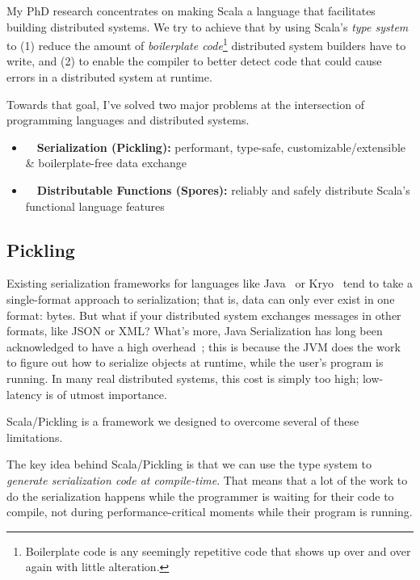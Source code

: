 \documentclass[acmtocl]{acmtrans2m}
\begin{document}
My PhD research concentrates on making Scala a language that facilitates
building distributed systems. We try to achieve that by using Scala's
\textit{type system} to (1) reduce the amount of \textit{boilerplate code}\footnote{Boilerplate code is any seemingly repetitive code that shows up over and over again with little alteration.} distributed system builders have to write, and
(2) to enable the compiler to better detect code that could cause errors
in a distributed system at runtime.

Towards that goal, I've solved two major problems at the intersection of
programming languages and distributed systems.

\vspace{-0.15in}
\begin{itemize}
\item ~~\textbf{\textsf{Serialization (Pickling):}} performant, type-safe, customizable/extensible \& boilerplate-free data exchange
\item ~~\textbf{\textsf{Distributable Functions (Spores):}} reliably and safely distribute Scala's functional language features
\end{itemize}

\vspace{-0.2in}
\subsection*{\textbf{Pickling}}
\vspace{-0.1in}

Existing serialization frameworks for languages like
Java~\cite{JavaSerialization} or Kryo~\cite{Kryo} tend to take a single-format
approach to serialization; that is, data can only ever exist in one format:
bytes. But what if your distributed system exchanges messages in other
formats, like JSON or XML? What's more, Java Serialization has long been
acknowledged to have a high overhead~\cite{JavaSlow1, Javaslow2}; this is
because the JVM does the work to figure out how to serialize objects at
runtime, while the user's program is running. In many real distributed
systems, this cost is simply too high; low-latency is of utmost importance.

Scala/Pickling is a framework we designed to overcome several of these
limitations.

The key idea behind Scala/Pickling is that we can use the type system to
\textit{generate serialization code at compile-time}. That means that a lot of
the work to do the serialization happens while the programmer is waiting for
their code to compile, not during performance-critical moments while their
program is running.
\end{document}
